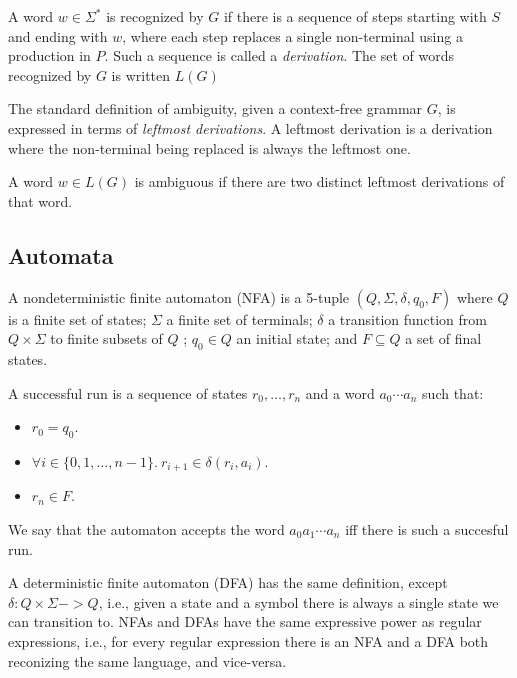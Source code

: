 \documentclass[acmsmall,review,anonymous]{acmart}\settopmatter{printfolios=true,printccs=false,printacmref=false}
\newcommand{\T}{\Sigma} %
\begin{document}
%
A word $w \in \T^{*}$ is recognized by $G$ if there is a sequence of steps starting with $S$ and ending with $w$, where each step replaces a single non-terminal using a production in $P$. Such a sequence is called a \emph{derivation}. The set of words recognized by $G$ is written $L(G)$


The standard definition of ambiguity, given a context-free grammar $G$, is expressed in terms of \emph{leftmost derivations}. A leftmost derivation is a derivation where the non-terminal being replaced is always the leftmost one.

\begin{definition}
A word $w \in L(G)$ is ambiguous if there are two distinct leftmost derivations of that word.
\end{definition}

\subsection{Automata} \label{sec:preliminaries-automata}

A nondeterministic finite automaton (NFA) is a 5-tuple $(Q, \T, \delta, q_0, F)$ where $Q$ is a finite set of states; $\T$ a finite set of terminals; $\delta$ a transition function from $Q \times \T$ to finite subsets of $Q$ ; $q_0 \in Q$ an initial state; and $F \subseteq Q$ a set of final states.

A successful run is a sequence of states $r_0, \ldots, r_n$ and a word $a_0\cdots a_n$ such that:

\begin{itemize}
\item $r_0 = q_0$.
\item $\forall i \in \{0, 1, \ldots, n-1\}.\ r_{i+1} \in \delta(r_i, a_i)$.
\item $r_n \in F$.
\end{itemize}

\noindent We say that the automaton accepts the word $a_0a_1\cdots a_n$ iff there is such a succesful run.

A deterministic finite automaton (DFA) has the same definition, except $\delta : Q \times \Sigma -> Q$, i.e., given a state and a symbol there is always a single state we can transition to. NFAs and DFAs have the same expressive power as regular expressions, i.e., for every regular expression there is an NFA and a DFA both reconizing the same language, and vice-versa. %
\end{document}
